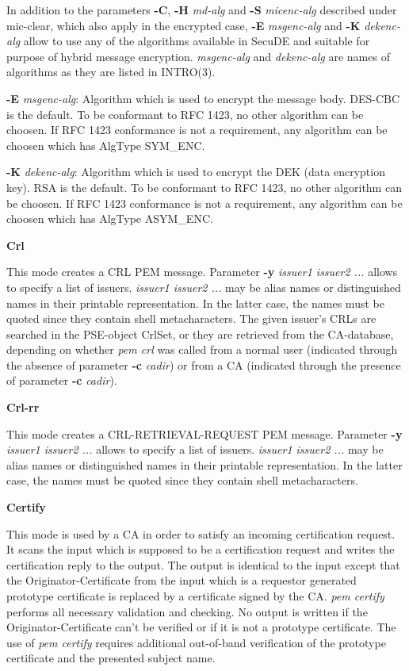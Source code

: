 In addition to the parameters {\bf -C}, {\bf -H} {\em md-alg} and {\bf -S} {\em micenc-alg} 
described under mic-clear, which also apply in the encrypted case, {\bf -E} {\em msgenc-alg} and
{\bf -K} {\em dekenc-alg} allow to use any of the algorithms available in SecuDE and suitable 
for purpose of hybrid message encryption. {\em msgenc-alg} and {\em dekenc-alg}
are names of algorithms as they are listed in INTRO(3).

{\bf -E} {\em msgenc-alg}: Algorithm which is used to encrypt the message body.
DES-CBC is the default.
To be conformant to RFC 1423, no other algorithm can be choosen. If RFC 1423
conformance is not a requirement, any algorithm can be choosen which has AlgType SYM\_ENC.

{\bf -K} {\em dekenc-alg}: Algorithm which is used to encrypt the DEK (data encryption key).
RSA is the default.
To be conformant to RFC 1423, no other algorithm can be choosen. If RFC 1423
conformance is not a requirement, any algorithm can be choosen which has AlgType ASYM\_ENC.

{\large\bf Crl}

This mode creates a CRL PEM message. Parameter {\bf -y} {\em issuer1 issuer2 ...}
allows to specify a list of issuers. {\em issuer1 issuer2 ...} may be alias names or distinguished
names in their printable representation. In the latter case, the names must be quoted since they
contain shell metacharacters. The given issuer's CRLs are searched in the PSE-object CrlSet, or they
are retrieved from the CA-database, depending on whether {\em pem crl} was called from a normal
user (indicated through the absence of parameter {\bf -c} {\em cadir}) or from a CA (indicated through 
the presence of parameter {\bf -c} {\em cadir}).

{\large\bf Crl-rr}

This mode creates a CRL-RETRIEVAL-REQUEST PEM message. Parameter {\bf -y} {\em issuer1 issuer2 
...}
allows to specify a list of issuers. {\em issuer1 issuer2 ...} may be alias names or distinguished
names in their printable representation. In the latter case, the names must be quoted since they
contain shell metacharacters.

{\large\bf Certify}

This mode is used by a CA in order to satisfy an incoming certification request. It scans the input
which is supposed to be a certification request and writes the certification reply to the output.
The output is identical to the input except that the Originator-Certificate from the input which
is a requestor generated prototype certificate is replaced by a certificate signed by the CA.
{\em pem certify} performs all necessary validation and checking. No output is written if the
Originator-Certificate can't be verified or if it is not a prototype certificate. The use
of {\em pem certify} requires additional out-of-band verification of the prototype certificate
and the presented subject name.

